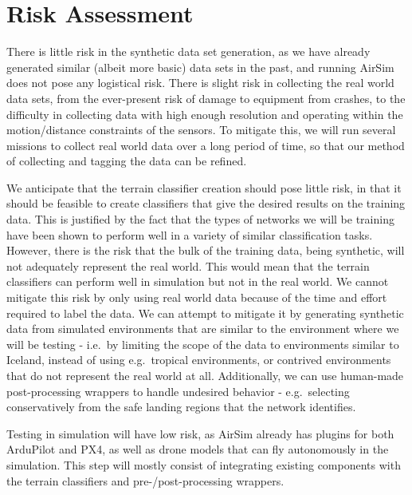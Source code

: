 \section{Risk Assessment}
\label{section:risk_assessment}

There is little risk in the synthetic data set generation, as we have already generated similar
(albeit more basic) data sets in the past, and running AirSim does not pose any logistical risk.
There is slight risk in collecting the real world data sets, from the ever-present risk of damage
to equipment from crashes, to the difficulty in collecting data with high enough resolution and
operating within the motion/distance constraints of the sensors.
To mitigate this, we will run several missions to collect real world data over a long period of time,
so that our method of collecting and tagging the data can be refined.

We anticipate that the terrain classifier creation should pose little risk, in that it should be
feasible to create classifiers that give the desired results on the training data.
This is justified by the fact that the types of networks we will be training have been shown to
perform well in a variety of similar classification tasks.
However, there is the risk that the bulk of the training data, being synthetic, will not adequately
represent the real world.
This would mean that the terrain classifiers can perform well in simulation
but not in the real world.
We cannot mitigate this risk by only using real world data because of the time and effort
required to label the data.
We can attempt to mitigate it by generating synthetic data from simulated environments that are
similar to the environment where we will be testing - i.e.~by limiting the scope of the data
to environments similar to Iceland, instead of using e.g.~tropical environments,
or contrived environments that do not represent the real world at all.
Additionally, we can use human-made post-processing wrappers to handle undesired behavior -
e.g.~selecting conservatively from the safe landing regions that the network identifies.

Testing in simulation will have low risk, as AirSim already has plugins for both ArduPilot and PX4,
as well as drone models that can fly autonomously in the simulation.
This step will mostly consist of integrating existing components with the terrain classifiers and
pre-/post-processing wrappers.

